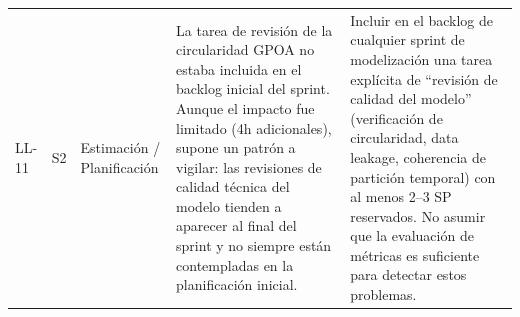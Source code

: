 \documentclass[12pt,a4paper]{article}
\begin{document}
\begin{longtable}{p{0.9cm} p{1.4cm} p{2.2cm} p{4.5cm} p{4.5cm}}
LL-11
  & S2
  & Estimación / Planificación
  & La tarea de revisión de la circularidad GPOA no estaba incluida en el backlog inicial del sprint. Aunque el impacto fue limitado (4h adicionales), supone un patrón a vigilar: las revisiones de calidad técnica del modelo tienden a aparecer al final del sprint y no siempre están contempladas en la planificación inicial.
  & Incluir en el backlog de cualquier sprint de modelización una tarea explícita de ``revisión de calidad del modelo'' (verificación de circularidad, data leakage, coherencia de partición temporal) con al menos 2--3 SP reservados. No asumir que la evaluación de métricas es suficiente para detectar estos problemas. \\

\end{longtable}
\end{document}
